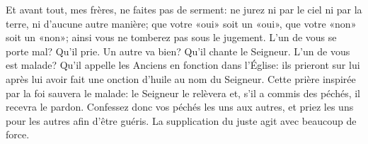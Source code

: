 Et avant tout, mes frères, ne faites pas de serment:
	ne jurez ni par le ciel ni par la terre, ni d’aucune autre manière;
	que votre «oui» soit un «oui», que votre «non» soit un «non»;
	ainsi vous ne tomberez pas sous le jugement.
L’un de vous se porte mal? Qu’il prie.
	Un autre va bien? Qu’il chante le Seigneur.
L’un de vous est malade?
	Qu’il appelle les Anciens en fonction dans l’Église:
	ils prieront sur lui
	après lui avoir fait une onction d’huile au nom du Seigneur.
Cette prière inspirée par la foi sauvera le malade:
	le Seigneur le relèvera
	et, s’il a commis des péchés, il recevra le pardon.
Confessez donc vos péchés les uns aux autres,
	et priez les uns pour les autres afin d’être guéris.
	La supplication du juste agit avec beaucoup de force.
